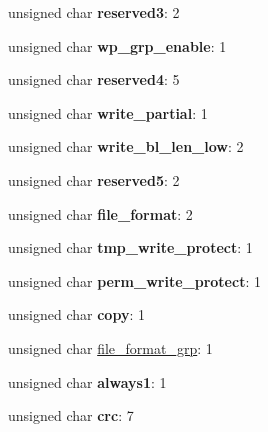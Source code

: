 \begin{DoxyCompactItemize}
\item 
\hypertarget{struct_c_s_d_v1_a6525406821be82277577a768a2d4e904}{unsigned char {\bfseries reserved3}\-: 2}\label{struct_c_s_d_v1_a6525406821be82277577a768a2d4e904}

\item 
\hypertarget{struct_c_s_d_v1_ab4247b023129bd89e0cebe8508b35f0a}{unsigned char {\bfseries wp\-\_\-grp\-\_\-enable}\-: 1}\label{struct_c_s_d_v1_ab4247b023129bd89e0cebe8508b35f0a}

\item 
\hypertarget{struct_c_s_d_v1_a1dcde2e7c54e279f4d7aac27d130cc17}{unsigned char {\bfseries reserved4}\-: 5}\label{struct_c_s_d_v1_a1dcde2e7c54e279f4d7aac27d130cc17}

\item 
\hypertarget{struct_c_s_d_v1_a062890f25943538976760e7db822a635}{unsigned char {\bfseries write\-\_\-partial}\-: 1}\label{struct_c_s_d_v1_a062890f25943538976760e7db822a635}

\item 
\hypertarget{struct_c_s_d_v1_ad61c0325b9602bdb15cf59b69fc4a67f}{unsigned char {\bfseries write\-\_\-bl\-\_\-len\-\_\-low}\-: 2}\label{struct_c_s_d_v1_ad61c0325b9602bdb15cf59b69fc4a67f}

\item 
\hypertarget{struct_c_s_d_v1_a6dd54d3f51fc8f0916d8882851d26d91}{unsigned char {\bfseries reserved5}\-: 2}\label{struct_c_s_d_v1_a6dd54d3f51fc8f0916d8882851d26d91}

\item 
\hypertarget{struct_c_s_d_v1_aa1a7dd102774cf915cbe66010250253d}{unsigned char {\bfseries file\-\_\-format}\-: 2}\label{struct_c_s_d_v1_aa1a7dd102774cf915cbe66010250253d}

\item 
\hypertarget{struct_c_s_d_v1_a0d4a26aaf05de47ca630a0976e897f90}{unsigned char {\bfseries tmp\-\_\-write\-\_\-protect}\-: 1}\label{struct_c_s_d_v1_a0d4a26aaf05de47ca630a0976e897f90}

\item 
\hypertarget{struct_c_s_d_v1_a674d846d31b5a170bf7b2a27d8c8856a}{unsigned char {\bfseries perm\-\_\-write\-\_\-protect}\-: 1}\label{struct_c_s_d_v1_a674d846d31b5a170bf7b2a27d8c8856a}

\item 
\hypertarget{struct_c_s_d_v1_a0ff3051eb9cb79426196331363674fa7}{unsigned char {\bfseries copy}\-: 1}\label{struct_c_s_d_v1_a0ff3051eb9cb79426196331363674fa7}

\item 
unsigned char \hyperlink{struct_c_s_d_v1_aa44f7b6ef5fd710a716fa9ef045c68f0}{file\-\_\-format\-\_\-grp}\-: 1
\item 
\hypertarget{struct_c_s_d_v1_af3bbe76c61e108c500f5a861dff1e6c2}{unsigned char {\bfseries always1}\-: 1}\label{struct_c_s_d_v1_af3bbe76c61e108c500f5a861dff1e6c2}

\item 
\hypertarget{struct_c_s_d_v1_aa7963a1d695d609cf3609747cf19fd71}{unsigned char {\bfseries crc}\-: 7}\label{struct_c_s_d_v1_aa7963a1d695d609cf3609747cf19fd71}

\end{DoxyCompactItemize}


